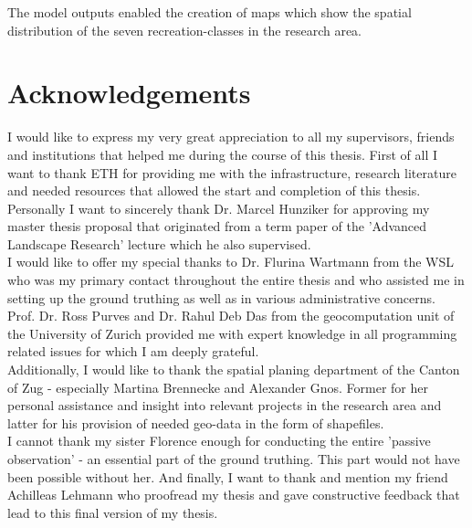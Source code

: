 The model outputs enabled the creation of maps which show the spatial distribution of the seven recreation-classes in the research area. \\

\cleardoublepage

\chapter*{Acknowledgements} \label{acknowledgements}
I would like to express my very great appreciation to all my supervisors, friends and institutions that helped me during the course of this thesis. First of all I want to thank ETH for providing me with the infrastructure, research literature and needed resources that allowed the start and completion of this thesis.\\
Personally I want to sincerely thank Dr. Marcel Hunziker for approving my master thesis proposal that originated from a term paper of the 'Advanced Landscape Research' lecture which he also supervised. \\
I would like to offer my special thanks to Dr. Flurina Wartmann from the WSL who was my primary contact throughout the entire thesis and who assisted me in setting up the ground truthing as well as in various administrative concerns. \\
Prof. Dr. Ross Purves and Dr. Rahul Deb Das from the geocomputation unit of the University of Zurich provided me with expert knowledge in all programming related issues for which I am deeply grateful.\\

Additionally, I would like to thank the spatial planing department of the Canton of Zug - especially Martina Brennecke and Alexander Gnos. Former for her personal assistance and insight into relevant projects in the research area and latter for his provision of needed geo-data in the form of shapefiles.\\

I cannot thank my sister Florence enough for conducting the entire 'passive observation' - an essential part of the ground truthing. This part would not have been possible without her. And finally, I want to thank and mention my friend Achilleas Lehmann who proofread my thesis and gave constructive feedback that lead to this final version of my thesis.

\cleardoublepage

